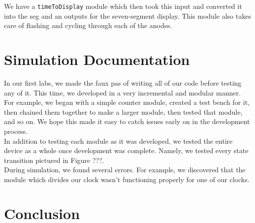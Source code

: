 \documentclass[]{article}
\begin{document}
We have a \texttt{timeToDisplay} module which then took this input and converted it into the seg and an outputs for the seven-segment display. This module also takes care of flashing and cycling through each of the anodes.








\section{Simulation Documentation}

In our first labs, we made the faux pas of writing all of our code before testing any of it. This time, we developed in a very incremental and modular manner. For example, we began with a simple counter module, created a test bench for it, then chained them together to make a larger module, then tested that module, and so on. We hope this made it easy to catch issues early on in the development process.\\

In addition to testing each module as it was developed, we tested the entire device as a whole once development was complete. Namely, we tested every state transition pictured in Figure ???.\\

During simulation, we found several errors. For example, we discovered that the module which divides our clock wasn't functioning properly for one of our clocks.

\section{Conclusion}
\end{document}
